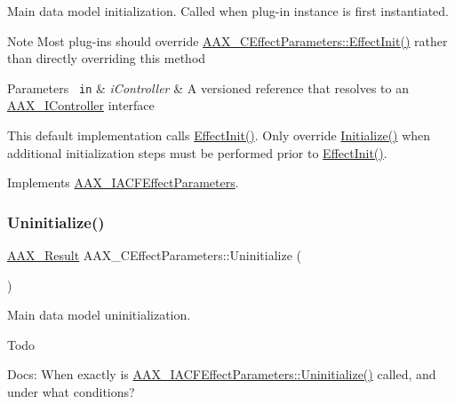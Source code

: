 Main data model initialization. Called when plug-\/in instance is first instantiated. 

\begin{DoxyNote}{Note}
Most plug-\/ins should override \mbox{\hyperlink{a01481_a2e302fd758d39a6a855023bf825fe148}{A\+A\+X\+\_\+\+C\+Effect\+Parameters\+::\+Effect\+Init()}} rather than directly overriding this method
\end{DoxyNote}

\begin{DoxyParams}[1]{Parameters}
\mbox{\texttt{ in}}  & {\em i\+Controller} & A versioned reference that resolves to an \mbox{\hyperlink{a01789}{A\+A\+X\+\_\+\+I\+Controller}} interface\\
\hline
\end{DoxyParams}
This default implementation calls \mbox{\hyperlink{a01481_a2e302fd758d39a6a855023bf825fe148}{Effect\+Init()}}. Only override \mbox{\hyperlink{a01481_a245f235300b04f1c8b4c83831d296e22}{Initialize()}} when additional initialization steps must be performed prior to \mbox{\hyperlink{a01481_a2e302fd758d39a6a855023bf825fe148}{Effect\+Init()}}. 

Implements \mbox{\hyperlink{a01669_ad4db3c0ab67f8f41cdd042a915daabb4}{A\+A\+X\+\_\+\+I\+A\+C\+F\+Effect\+Parameters}}.

\mbox{\label{a01481_acd14ff2175a10759045674e8e14508b1}} 
\subsubsection{\texorpdfstring{Uninitialize()}{Uninitialize()}}
{\footnotesize\ttfamily \mbox{\hyperlink{a00392_a4d8f69a697df7f70c3a8e9b8ee130d2f}{A\+A\+X\+\_\+\+Result}} A\+A\+X\+\_\+\+C\+Effect\+Parameters\+::\+Uninitialize (\begin{DoxyParamCaption}\item[{void}]{ }\end{DoxyParamCaption})\hspace{0.3cm}{\ttfamily [virtual]}}



Main data model uninitialization. 

\begin{DoxyRefDesc}{Todo}
\item[\mbox{\hyperlink{a00785__todo000035}{Todo}}]Docs\+: When exactly is \mbox{\hyperlink{a01669_a711969adc95624fb9ac8a3e3b2c23696}{A\+A\+X\+\_\+\+I\+A\+C\+F\+Effect\+Parameters\+::\+Uninitialize()}} called, and under what conditions?\end{DoxyRefDesc}



